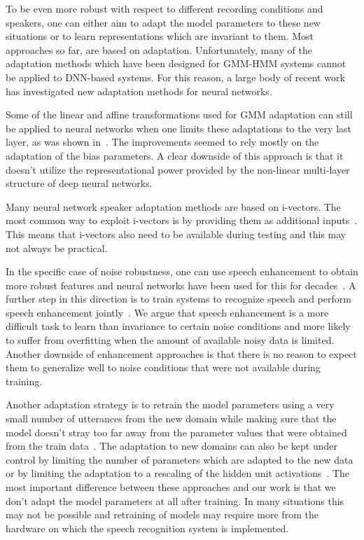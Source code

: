 \documentclass[a4paper]{article}
\begin{document}
    To be even more robust with respect to different recording conditions and speakers,
    one can either aim to adapt the model parameters to these new situations or
    to learn representations which are invariant to them.
    Most approaches so far, are based on adaptation.
    Unfortunately, many of the adaptation methods which have been designed for
    GMM-HMM systems cannot be applied to DNN-based systems. For this reason, a
    large body of recent work has investigated new adaptation methods for neural
    networks.

    Some of the linear and affine transformations used for GMM adaptation can
    still be applied to neural networks when one limits these adaptations to the
    very last layer, as was shown in~\cite{yao2012adaptation}. The
    improvements seemed to rely mostly on the adaptation of the bias parameters.
    A clear downside of this approach is that it doesn't utilize the
    representational power provided by the non-linear multi-layer structure of deep
    neural networks.

    Many neural network speaker adaptation methods are based on
    i-vectors. The most common way to exploit i-vectors is by providing them as additional
    inputs~\cite{senior2014improving,saon2013speaker}. This means that i-vectors also need to
    be available during testing and this may not always be practical.

    In the specific case of noise robustness, one can use speech enhancement to
    obtain more robust features and neural networks have been used for this for
    decades~\cite{knecht1995neural}. A further step in this direction is to train
    systems to recognize speech and perform speech enhancement jointly~\cite{narayanan2014joint}. 
    We argue that speech enhancement is a more difficult task to learn than
    invariance to certain noise conditions and more likely to suffer from
    overfitting when the amount of available noisy data is limited.
    Another downside of enhancement approaches is that there is no reason to
    expect them to generalize well to noise conditions that were not available during
    training.

    Another adaptation strategy is to retrain the model parameters using a very small
    number of utterances from the new domain while making sure that the model
    doesn't stray too far away from the parameter values that were obtained from
    the train data~\cite{yu2013kl}.
    The adaptation to new domains can also be kept under control by limiting
    the number of parameters which are adapted to the new data or by limiting the
    adaptation to a rescaling of the hidden unit activations~\cite{swietojanski2014learning}.
    The most important difference between these approaches and our work is that
    we don't adapt the model parameters at all after training. In many
    situations this may not be possible and retraining of models may require more
    from the hardware on which the speech recognition system is implemented.
\end{document}
